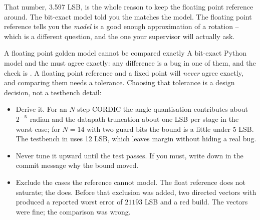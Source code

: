 

That number, 3.597 LSB, is the whole reason to keep the floating point
reference around. The bit-exact model told you the \RTL{} matches the model.
The floating point reference tells you the \emph{model} is a good enough
approximation of a rotation -- which is a different question, and the one
your supervisor will actually ask.

\begin{gotcha}{A floating point golden model cannot be compared exactly}
A bit-exact Python model and the \RTL{} must agree exactly: any difference is
a bug in one of them, and the check is \code{==}. A floating point reference
and a fixed point \DUT{} will \emph{never} agree exactly, and comparing them
needs a tolerance. Choosing that tolerance is a design decision, not a
testbench detail:
\begin{itemize}
\item Derive it. For an \(N\)-step CORDIC the angle quantisation contributes
      about \(2^{-N}\) radian and the datapath truncation about one LSB per
      stage in the worst case; for \(N = 14\) with two guard bits the bound is
      a little under 5 LSB. The testbench in  uses 12 LSB, which
      leaves margin without hiding a real bug.
\item Never tune it upward until the test passes. If you must, write down in
      the commit message why the bound moved.
\item Exclude the cases the reference cannot model. The float reference does
      not saturate; the \DUT{} does. Before that exclusion was added, two
      directed vectors with  produced a reported worst error
      of \(21193\) LSB and a red build. The vectors were fine; the comparison
      was wrong.
\end{itemize}
\end{gotcha}

